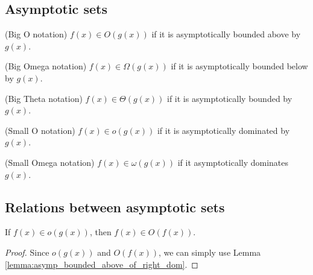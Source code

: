 \subsection{Asymptotic sets}

\begin{definition}(Big O notation)
    \label{def:big_o}
    \leanok
    $f(x) \in O(g(x))$ if it is asymptotically bounded above by $g(x)$.
\end{definition}

\begin{definition}(Big Omega notation)
    \label{def:big_omega}
    \leanok
    $f(x) \in \Omega(g(x))$ if it is asymptotically bounded below by $g(x)$.
\end{definition}

\begin{definition}(Big Theta notation)
    \label{def:big_theta}
    \leanok
    $f(x) \in \Theta(g(x))$ if it is asymptotically bounded by $g(x)$. 
\end{definition}

\begin{definition}(Small O notation)
    \label{def:small_o}
    \leanok
    $f(x) \in o(g(x))$ if it is asymptotically dominated by $g(x)$.
\end{definition}

\begin{definition}(Small Omega notation)
    \label{def:small_omega}
    \leanok
    $f(x) \in \omega(g(x))$ if it asymptotically dominates $g(x)$.
\end{definition}


\subsection{Relations between asymptotic sets} 

\begin{lemma}
    \label{lemma:big_o_of_small_o}
    \leanok
    If $f(x) \in o(g(x))$, then $f(x) \in O(f(x))$.
\end{lemma}

\begin{proof}
    \leanok
    Since $o(g(x))$ and $O(f(x))$, we can simply use Lemma 
    \ref{lemma:asymp_bounded_above_of_right_dom}.
\end{proof}

